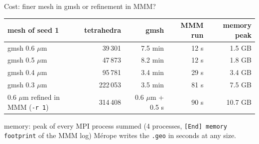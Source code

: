 \documentclass[10pt,aspectratio=169]{beamer}
\newcommand{\code}[1]{\texttt{#1}}
\begin{document}
\begin{frame}{Cost: finer mesh in gmsh or refinement in MMM?}
\centering\small
\begin{tabular}{@{}lrrrr@{}}
\toprule
mesh of seed 1 & tetrahedra & gmsh & MMM run & memory peak \\
\midrule
gmsh 0.6 $\mu$m & 39\,301 & 7.5 min & 12 s & 1.5 GB \\
gmsh 0.5 $\mu$m & 47\,873 & 8.2 min & 12 s & 1.8 GB \\
gmsh 0.4 $\mu$m & 95\,781 & 3.4 min & 29 s & 3.4 GB \\
gmsh 0.3 $\mu$m & 222\,053 & 3.5 min & 81 s & 7.5 GB \\
0.6 $\mu$m refined in MMM (\code{-r 1}) & 314\,408 & 0.6 $\mu$m + 0.5 s & 90 s & 10.7 GB \\
\bottomrule
\end{tabular}

\vspace{2pt}
{\scriptsize\raggedright memory: peak of every MPI process summed (4 processes, \code{[End] memory footprint} of the MMM
log) %
M\'erope writes the \code{.geo} in seconds at any size.\par}
\vspace{4pt}

\raggedright\footnotesize
\end{frame}
\end{document}

